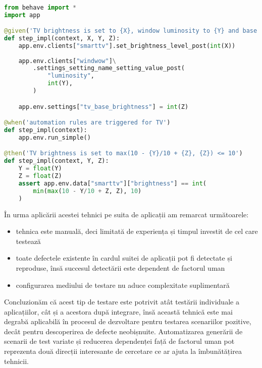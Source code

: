 \begin{lstlisting}[caption={Exemplu de test automat folosind biblioteca Behave}, label={exemplu_python_behave}, language={Python}]

from behave import *
import app

@given('TV brightness is set to {X}, window luminosity to {Y} and base luminosity to {Z}')
def step_impl(context, X, Y, Z):
    app.env.clients["smarttv"].set_brightness_level_post(int(X))
    
    app.env.clients["windwow"]\
        .settings_setting_name_setting_value_post(
            "luminosity", 
            int(Y),
        )

    app.env.settings["tv_base_brightness"] = int(Z)

@when('automation rules are triggered for TV')
def step_impl(context):
    app.env.run_simple()

@then('TV brightness is set to max(10 - {Y}/10 + {Z}, {Z}) <= 10')
def step_impl(context, Y, Z):
    Y = float(Y)
    Z = float(Z)
    assert app.env.data["smarttv"]["brightness"] == int(
        min(max(10 - Y/10 + Z, Z), 10)
    )
\end{lstlisting}

În urma aplicării acestei tehnici pe suita de aplicații am remarcat următoarele:
\begin{itemize}
    \item tehnica este manuală, deci limitată de experiența și timpul investit de cel care testează
    \item toate defectele existente în cardul suitei de aplicații pot fi detectate și reproduse, însă succesul detectării este dependent de factorul uman
    \item configurarea mediului de testare nu aduce complexitate suplimentară
\end{itemize}

Concluzionăm că acest tip de testare este potrivit atât testării individuale a aplicațiilor, cât și a acestora după integrare, însă această tehnică este mai degrabă aplicabilă în procesul de dezvoltare pentru testarea scenariilor pozitive, decât pentru descoperirea de defecte neobișnuite. Automatizarea generării de scenarii de test variate și reducerea dependenței față de factorul uman pot reprezenta două direcții interesante de cercetare ce ar ajuta la îmbunătățirea tehnicii.


